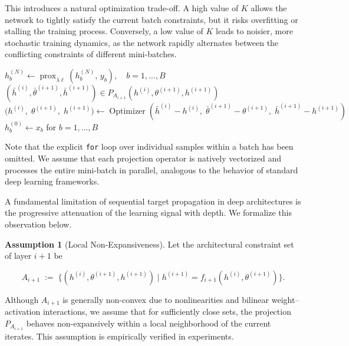 \documentclass{article}
\theoremstyle{plain}
\theoremstyle{definition}
\newtheorem{assumption}[theorem]{Assumption}
\theoremstyle{remark}
\begin{document}
This introduces a natural optimization trade-off. A high value of $K$ allows the network to tightly satisfy the current batch constraints, but it risks overfitting or stalling the training process. Conversely, a low value of $K$ leads to noisier, more stochastic training dynamics, as the network rapidly alternates between the conflicting constraints of different mini-batches.

\begin{algorithm}[htbp]
\caption{Mini-Batch $\mathcal{P}$Torch}
\begin{algorithmic}[1]
\State $h^{(N)}_b \gets \operatorname{prox}_{\lambda \ell}\!\left(h^{(N)}_b,\, y_b\right), \quad b=1,\ldots,B$
 
     
        \State $(\bar h^{(i)}, \bar \theta^{(i+1)}, \bar h^{(i+1)}) \in P_{A_{i+1}}(h^{(i)}, \theta^{(i+1)}, h^{(i+1)})$ 
        \State $\bigl(h^{(i)},\;\theta^{(i+1)},\;h^{(i+1)}\bigr) \gets \operatorname{Optimizer}\!\left( \bar{h}^{(i)} - h^{(i)},\; \bar{\theta}^{(i+1)} - \theta^{(i+1)},\; \bar{h}^{(i+1)} - h^{(i+1)} \right)$
    \EndFor
\EndFor
\State $h^{(0)}_b \gets x_b$ for $b=1,\ldots,B$
\end{algorithmic}
\end{algorithm}

Note that the explicit \texttt{for} loop over individual samples within a batch has been omitted. We assume that each projection operator is natively vectorized and processes the entire mini-batch in parallel, analogous to the behavior of standard deep learning frameworks.

A fundamental limitation of sequential target propagation in deep architectures is the progressive attenuation of the learning signal with depth. We formalize this observation below.

{\color{red}
\begin{assumption}[Local Non-Expansiveness]
\label{ass:non-expansive}
Let the architectural constraint set of layer $i+1$ be

$$A_{i+1} \;:=\; \{(h^{(i)}, \theta^{(i+1)}, h^{(i+1)}) \mid h^{(i+1)} = f_{i+1}(h^{(i)}, \theta^{(i+1)})\}.$$

Although $A_{i+1}$ is generally non-convex due to nonlinearities and bilinear weight--activation interactions, we assume that for sufficiently close sets, the projection $P_{A_{i+1}}$ behaves non-expansively within a local neighborhood of the current iterates. This assumption is empirically verified in experiments.
\end{assumption}
}
\end{document}
